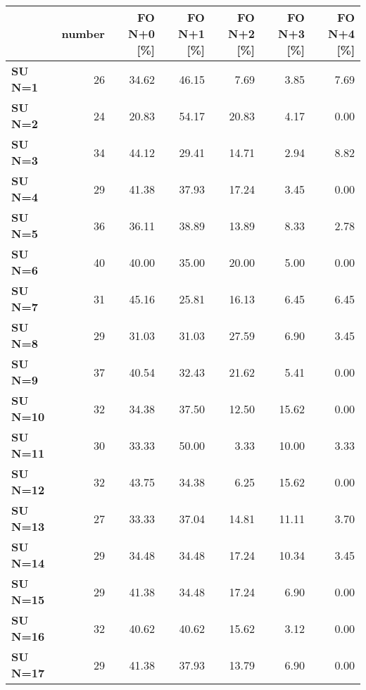 \begin{tabular}{lrrrrrr}
\toprule
{} &  number &  FO N+0 [\%] &  FO N+1 [\%] &  FO N+2 [\%] &  FO N+3 [\%] &  FO N+4 [\%] \\
\midrule
\textbf{SU N=1 } &      26 &       34.62 &       46.15 &        7.69 &        3.85 &        7.69 \\
\textbf{SU N=2 } &      24 &       20.83 &       54.17 &       20.83 &        4.17 &        0.00 \\
\textbf{SU N=3 } &      34 &       44.12 &       29.41 &       14.71 &        2.94 &        8.82 \\
\textbf{SU N=4 } &      29 &       41.38 &       37.93 &       17.24 &        3.45 &        0.00 \\
\textbf{SU N=5 } &      36 &       36.11 &       38.89 &       13.89 &        8.33 &        2.78 \\
\textbf{SU N=6 } &      40 &       40.00 &       35.00 &       20.00 &        5.00 &        0.00 \\
\textbf{SU N=7 } &      31 &       45.16 &       25.81 &       16.13 &        6.45 &        6.45 \\
\textbf{SU N=8 } &      29 &       31.03 &       31.03 &       27.59 &        6.90 &        3.45 \\
\textbf{SU N=9 } &      37 &       40.54 &       32.43 &       21.62 &        5.41 &        0.00 \\
\textbf{SU N=10} &      32 &       34.38 &       37.50 &       12.50 &       15.62 &        0.00 \\
\textbf{SU N=11} &      30 &       33.33 &       50.00 &        3.33 &       10.00 &        3.33 \\
\textbf{SU N=12} &      32 &       43.75 &       34.38 &        6.25 &       15.62 &        0.00 \\
\textbf{SU N=13} &      27 &       33.33 &       37.04 &       14.81 &       11.11 &        3.70 \\
\textbf{SU N=14} &      29 &       34.48 &       34.48 &       17.24 &       10.34 &        3.45 \\
\textbf{SU N=15} &      29 &       41.38 &       34.48 &       17.24 &        6.90 &        0.00 \\
\textbf{SU N=16} &      32 &       40.62 &       40.62 &       15.62 &        3.12 &        0.00 \\
\textbf{SU N=17} &      29 &       41.38 &       37.93 &       13.79 &        6.90 &        0.00 \\
\bottomrule
\end{tabular}
